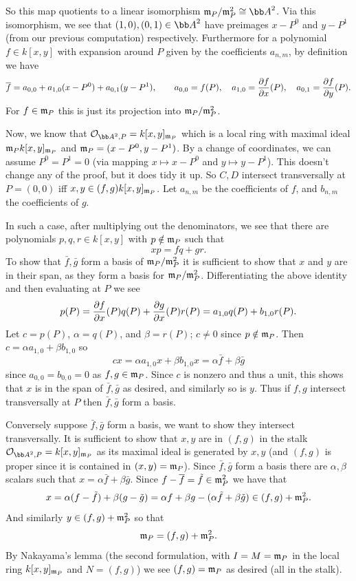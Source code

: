     So this map quotients to a linear isomorphism $\m_P/\m_P^2\cong\bA^2$.
    Via this isomorphism, we see that $(1,0),(0,1)\in\bA^2$ have preimages $x-P^0$ and $y-P^1$ (from our previous computation) respectively.
    Furthermore for a polynomial $f\in k[x,y]$ with expansion around $P$ given by the coefficients $a_{n,m}$, by definition we have
    $$ {\overline{f}} = a_{0,0} + a_{1,0}(x-P^0) + a_{0,1}(y-P^1),\qquad a_{0,0} = f(P),\quad a_{1,0} = {{\partial f}\over{\partial x}}(P),\quad a_{0,1} = {{\partial f}\over{\partial y}}(P) . $$
    For $f\in{{\frak m}}_P$ this is just its projection into ${{\frak m}}_P/{{\frak m}}_P^2$.

    Now, we know that $\O_{\bA^2,P}=k[x,y]_{\m_P}$ which is a local ring with maximal ideal ${{\frak m}}_Pk[x,y]_{{{\frak m}}_P}$ and ${{\frak m}}_P=(x-P^0,y-P^1)$.
    By a change of coordinates, we can assume $P^0=P^1=0$ (via mapping $x\mapsto x-P^0$ and $y\mapsto y-P^1$).
    This doesn't change any of the proof, but it does tidy it up.
    So $C,D$ intersect transversally at $P=(0,0)$ iff $x,y\in(f,g)k[x,y]_{{{\frak m}}_P}$.
    Let $a_{n,m}$ be the coefficients of $f$, and $b_{n,m}$ the coefficients of $g$.

    In such a case, after multiplying out the denominators, we see that there are polynomials $p,q,r\in k[x,y]$ with $p\notin{{\frak m}}_P$ such that
    $$ xp = fq + gr . $$
    To show that $\bar f,\bar g$ form a basis of ${{\frak m}}_P/{{\frak m}}_P^2$ it is sufficient to show that $x$ and $y$ are in their span, as they form a basis for ${{\frak m}}_P/{{\frak m}}_P^2$.
    Differentiating the above identity and then evaluating at $P$ we see
    $$ p(P) = {{\partial f}\over{\partial x}}(P)q(P) + {{\partial g}\over{\partial x}}(P)r(P) = a_{1,0}q(P) + b_{1,0}r(P) . $$
    Let $c=p(P)$, $\alpha=q(P)$, and $\beta=r(P)$; $c\neq0$ since $p\notin{{\frak m}}_P$.
    Then $c=\alpha a_{1,0}+\beta b_{1,0}$ so
    $$ cx = \alpha a_{1,0}x + \beta b_{1,0}x = \alpha\bar f + \beta\bar g $$
    since $a_{0,0}=b_{0,0}=0$ as $f,g\in{{\frak m}}_P$.
    Since $c$ is nonzero and thus a unit, this shows that $x$ is in the span of $\bar f,\bar g$ as desired, and similarly so is $y$.
    Thus if $f,g$ intersect transversally at $P$ then $\bar f,\bar g$ form a basis.

    Conversely suppose $\bar f,\bar g$ form a basis, we want to show they intersect transversally.
    It is sufficient to show that $x,y$ are in $(f,g)$ in the stalk $\O_{\bA^2,P}=k[x,y]_{\m_P}$ as its maximal ideal is generated by $x,y$ (and $(f,g)$ is proper since it
    is contained in $(x,y)={{\frak m}}_P$).
    Since $\bar f,\bar g$ form a basis there are $\alpha,\beta$ scalars such that $x=\alpha\bar f+\beta\bar g$.
    Since $f-{\overline{f}}=\tilde f\in{{\frak m}}_P^2$ we have that
    $$ x = \alpha(f-\tilde f) + \beta(g-\tilde g) = \alpha f + \beta g - (\alpha\tilde f + \beta\tilde g) \in (f,g) + {{\frak m}}_P^2 . $$
    And similarly $y\in(f,g)+{{\frak m}}_P^2$ so that
    $$ {{\frak m}}_P = (f,g) + {{\frak m}}_P^2 . $$
    By Nakayama's lemma (the second formulation, with $I=M={{\frak m}}_P$ in the local ring $k[x,y]_{{{\frak m}}_P}$ and $N=(f,g)$) we see $(f,g)={{\frak m}}_P$ as desired (all in the stalk).

